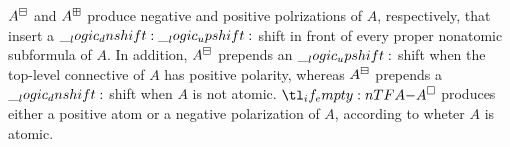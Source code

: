 $\embedn{A}$ and $\embedp{A}$ produce negative and positive polrizations of $A$, respectively, that insert a $\__logic_dnshift: \__logic_upshift:$ shift in front of every proper nonatomic subformula of $A$.
In addition, $\embedn{A}$ prepends an $\__logic_upshift:$ shift when the top-level connective of $A$ has positive polarity, whereas $\embedn{A}$ prepends a $\__logic_dnshift:$ shift when $A$ is not atomic.
$\embed{A}$ produces either a positive atom or a negative polarization of $A$, according to wheter $A$ is atomic.
%
